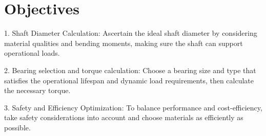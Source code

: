 \documentclass[../../main]{subfiles}
\begin{document}





\section{Objectives}

1. Shaft Diameter Calculation: Ascertain the ideal shaft diameter by
considering material qualities and bending moments, making sure the
shaft can support operational loads.

2. Bearing selection and torque calculation: Choose a bearing size and
type that satisfies the operational lifespan and dynamic load
requirements, then calculate the necessary torque.

3. Safety and Efficiency Optimization: To balance performance and
cost-efficiency, take safety considerations into account and choose
materials as efficiently as possible.
\end{document}
